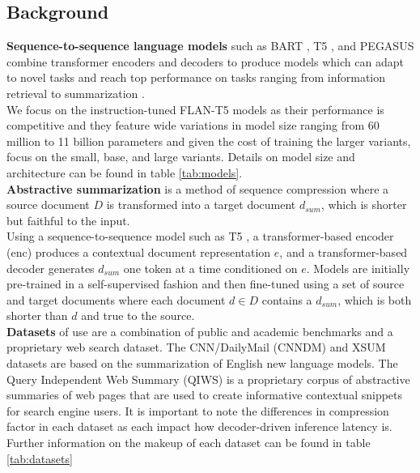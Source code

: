 \subsection{Background}
\textbf{Sequence-to-sequence language models} such as BART \cite{lewis-etal-2021-paq}, T5 \cite{Raffel2020ExploringTL}, and PEGASUS \cite{Zhang2020PEGASUSPW} combine transformer encoders and decoders to produce models which can adapt to novel tasks and reach top performance on tasks ranging from information retrieval \cite{Nogueira2020DocumentRW} to summarization \cite{Raffel2020ExploringTL}. \\
We focus on the instruction-tuned FLAN-T5 models \cite{Wei2021FinetunedLM} as their performance is competitive and they feature wide variations in model size ranging from 60 million to 11 billion parameters and given the cost of training the larger variants, focus on the small, base, and large variants. Details on model size and architecture can be found in table \ref{tab:models}.\\
\textbf{Abstractive summarization} is a method of sequence compression where a source document $D$ is transformed into a target document $d_{sum}$, which is shorter but faithful to the input. \\
Using a sequence-to-sequence model such as T5 \cite{Raffel2020ExploringTL}, a transformer-based encoder (enc) produces a contextual document representation $e$, and a transformer-based decoder generates $d_{sum}$ one token at a time conditioned on $e$. Models are initially pre-trained in a self-supervised fashion and then fine-tuned using a set of source and target documents where each document $d \in D$ contains a $d_{sum}$, which is both shorter than $d$ and true to the source. \\
\textbf{Datasets} of use are a combination of public and academic benchmarks and a proprietary web search dataset. The CNN/DailyMail (CNNDM) \cite{see-etal-2017-get} and XSUM \cite{Narayan2018DontGM} datasets are based on the summarization of English new language models. The Query Independent Web Summary (QIWS) is a proprietary corpus of abstractive summaries of web pages that are used to create informative contextual snippets for search engine users. It is important to note the differences in compression factor in each dataset as each impact how decoder-driven inference latency is. Further information on the makeup of each dataset can be found in table \ref{tab:datasets} \\
